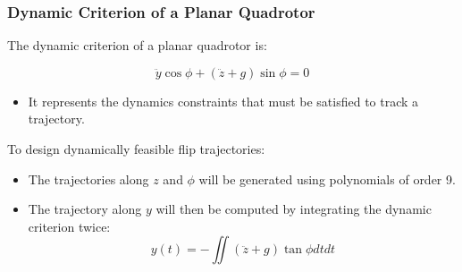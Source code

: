 \documentclass{thesisbeamer}
\newcommand\Fontvi{\fontsize{9}{10}\selectfont}
\begin{document}
\begin{frame}
	\frametitle{Dynamic Criterion of a Planar Quadrotor}
	\Fontvi
	
	The dynamic criterion of a planar quadrotor is\protect\footnotemark:
	
	\begin{equation}\label{dynamics_criterion_equation}
	\ddot{y} \cos \phi + (\ddot{z} + g) \sin \phi = 0
	\end{equation}


	\begin{itemize}
		\item It represents the dynamics constraints that must be satisfied to track a trajectory.
	\end{itemize}

	\vfill	
	To design dynamically feasible flip trajectories:
	
	\begin{itemize}
		\item The trajectories along $z$ and $\phi$ will be generated using polynomials of order 9.
		\item The trajectory along $y$ will then be computed by integrating the dynamic criterion twice: 
		\begin{equation}
			y(t) = - \iint (\ddot{z} + g) \tan \phi dt dt
		\end{equation}
	\end{itemize}
	

\end{frame}
\end{document}
